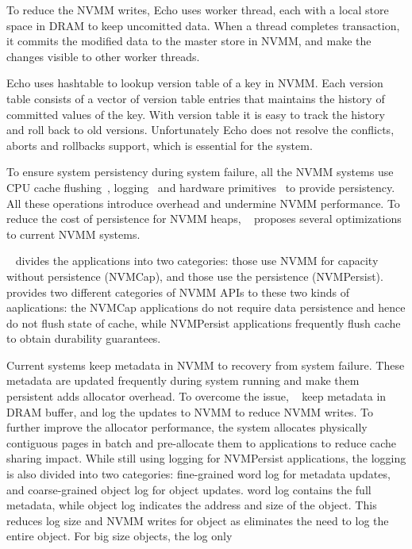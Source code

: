 To reduce the NVMM writes, Echo uses worker thread, each with a local store
space in DRAM to keep uncomitted data.
When a thread completes transaction, it commits the modified
data to the master store in NVMM, and make the changes visible to other
worker threads.

Echo uses hashtable to lookup version table of a key in NVMM. Each version table
consists of a vector of version table entries that maintains the history
of committed values of the key. With version table it is easy to track
the history and roll back to old versions. Unfortunately Echo does not
resolve the conflicts, aborts and rollbacks support, which is essential
for the system.

To ensure system persistency during system failure, all the NVMM systems
use CPU cache flushing~\cite{PMFS, nvheaps}, logging~\cite{PMFS, nvheaps,
mnemosyne} and hardware primitives~\cite{BPFS, PMFS} to provide persistency.
All these operations introduce overhead and undermine NVMM performance.
To reduce the cost of persistence for NVMM heaps, ~\cite{NVMCap} proposes
several optimizations to current NVMM systems.

~\cite{NVMCap} divides the applications into two categories: those
use NVMM for capacity without persistence (NVMCap), and those use the
persistence (NVMPersist). ~\cite{NVMCap} provides two different
categories of NVMM APIs to these two kinds of aaplications: the NVMCap
applications do not require data persistence and hence do not flush state
of cache, while NVMPersist applications frequently flush cache to obtain
durability guarantees.

Current systems keep metadata in NVMM to recovery from system failure.
These metadata are updated frequently during system running and make
them persistent adds allocator overhead. To overcome the issue, ~\cite{NVMCap}
keep metadata in DRAM buffer, and log the updates to NVMM to reduce NVMM
writes. To further improve the allocator performance, the system allocates
physically contiguous pages in batch and pre-allocate them to applications 
to reduce cache sharing impact. While still using logging for NVMPersist
applications, the logging is also divided into two categories: fine-grained
word log for metadata updates, and coarse-grained object log for object
updates. word log contains the full metadata, while object log indicates
the address and size of the object. This reduces log size and NVMM writes for
object as eliminates the need to log the entire object.
For big size objects, the log only 
